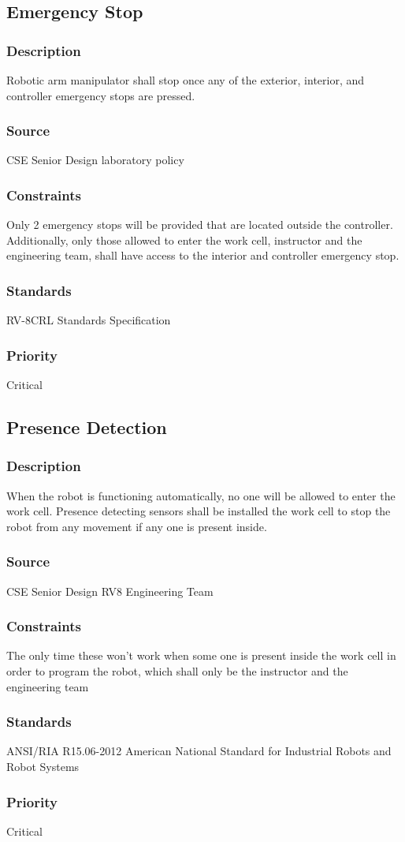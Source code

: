 \subsection{Emergency Stop}
\subsubsection{Description}
Robotic arm manipulator shall stop once any of the exterior, interior, and controller emergency stops are pressed.
\subsubsection{Source}
CSE Senior Design laboratory policy
\subsubsection{Constraints}
Only 2 emergency stops will be provided that are located outside the controller. Additionally, only those allowed to enter the work cell, instructor and the engineering team, shall have access to the interior and controller emergency stop.
\subsubsection{Standards}
RV-8CRL Standards Specification
\subsubsection{Priority}
Critical

\subsection{Presence Detection}
\subsubsection{Description}
When the robot is functioning automatically, no one will be allowed to enter the work cell. Presence detecting sensors shall be installed the work cell to stop the robot from any movement if any one is present inside.
\subsubsection{Source}
CSE Senior Design RV8 Engineering Team
\subsubsection{Constraints}
The only time these won't work when some one is present inside the work cell in order to program the robot, which shall only be the instructor and the engineering team
\subsubsection{Standards}
ANSI/RIA R15.06-2012 American National Standard for Industrial Robots and Robot Systems
\subsubsection{Priority}
Critical
